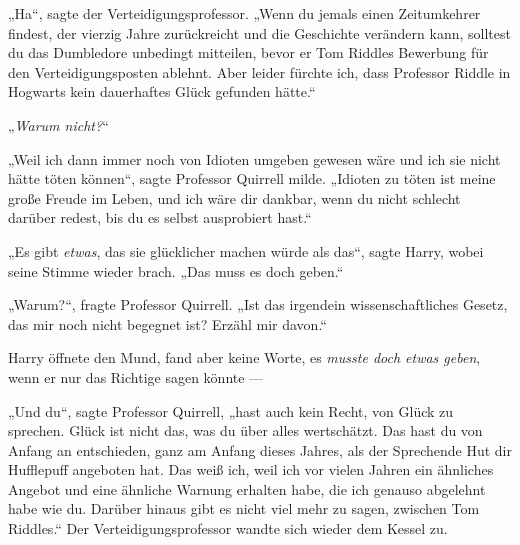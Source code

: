 „Ha“, sagte der Verteidigungsprofessor.
„Wenn du jemals einen Zeitumkehrer findest, der vierzig Jahre zurückreicht und die Geschichte verändern kann, solltest du das Dumbledore unbedingt mitteilen, bevor er Tom Riddles Bewerbung für den Verteidigungsposten ablehnt. Aber leider fürchte ich, dass Professor Riddle in Hogwarts kein dauerhaftes Glück gefunden hätte.“

„\emph{Warum nicht?}“

„Weil ich dann immer noch von Idioten umgeben gewesen wäre und ich sie nicht hätte töten können“, sagte Professor Quirrell milde.
„Idioten zu töten ist meine große Freude im Leben, und ich wäre dir dankbar, wenn du nicht schlecht darüber redest, bis du es selbst ausprobiert hast.“

„Es gibt \emph{etwas}, das sie glücklicher machen würde als das“, sagte Harry, wobei seine Stimme wieder brach.
„Das muss es doch geben.“

„Warum?“, fragte Professor Quirrell.
„Ist das irgendein wissenschaftliches Gesetz, das mir noch nicht begegnet ist? Erzähl mir davon.“

Harry öffnete den Mund, fand aber keine Worte, es \emph{musste doch etwas geben}, wenn er nur das Richtige sagen könnte —

„Und du“, sagte Professor Quirrell, „hast auch kein Recht, von Glück zu sprechen. Glück ist nicht das, was du über alles wertschätzt. Das hast du von Anfang an entschieden, ganz am Anfang dieses Jahres, als der Sprechende Hut dir Hufflepuff angeboten hat. Das weiß ich, weil ich vor vielen Jahren ein ähnliches Angebot und eine ähnliche Warnung erhalten habe, die ich genauso abgelehnt habe wie du. Darüber hinaus gibt es nicht viel mehr zu sagen, zwischen Tom Riddles.“
Der Verteidigungsprofessor wandte sich wieder dem Kessel zu.

